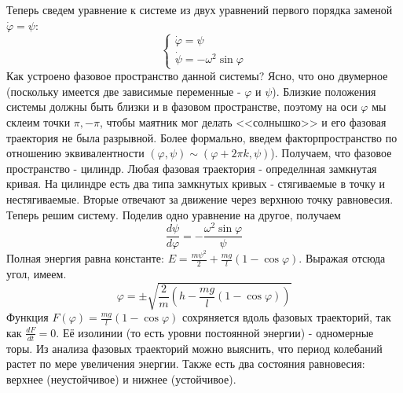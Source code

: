 Теперь сведем уравнение к системе из двух уравнений первого порядка 
заменой $\dot\varphi=\psi$:
$$\begin{cases}
    \dot\varphi=\psi\\
    \dot\psi=-\omega^2\sin\varphi
\end{cases}$$
Как устроено фазовое пространство данной системы? Ясно, что оно двумерное
(поскольку имеется две зависимые переменные - $\varphi$ и $\psi$). Близкие
положения системы должны быть близки и в фазовом пространстве, поэтому
на оси $\varphi$ мы склеим точки $\pi,-\pi$, чтобы маятник мог делать
<<солнышко>> и его фазовая траектория не была разрывной. Более формально, 
введем факторпространство по отношению эквивалентности 
$(\varphi,\psi)\sim(\varphi+2\pi k,\psi)$). 
Получаем, что фазовое пространство - цилиндр. Любая фазовая траектория - 
определнная замкнутая кривая. На цилиндре есть два типа замкнутых кривых 
- стягиваемые в точку и нестягиваемые. Вторые отвечают за движение
через верхнюю точку равновесия. \\
Теперь решим систему. Поделив одно уравнение на другое, получаем 
$$\frac{d\psi}{d\varphi}=-\frac{\omega^2\sin\varphi}{\psi}$$
Полная энергия равна константе:
$E = \frac{m\psi^2}{2}+\frac{mg}{l}(1-\cos\varphi)$. Выражая 
отсюда угол, имеем. 
$$\varphi=\pm\sqrt{\frac{2}{m}\left( h-\frac{mg}{l}(1-\cos\varphi)\right)}$$ 
Функция $F(\varphi)=\frac{mg}{l}(1-\cos\varphi)$ сохряняется вдоль 
фазовых траекторий, так как $\frac{dF}{dt}=0$. Её изолинии (то есть
уровни постоянной энергии) - одномерные торы. Из анализа фазовых траекторий
можно выяснить, что период колебаний растет по
мере увеличения энергии. Также есть два состояния равновесия: верхнее 
(неустойчивое) и нижнее (устойчивое). 









